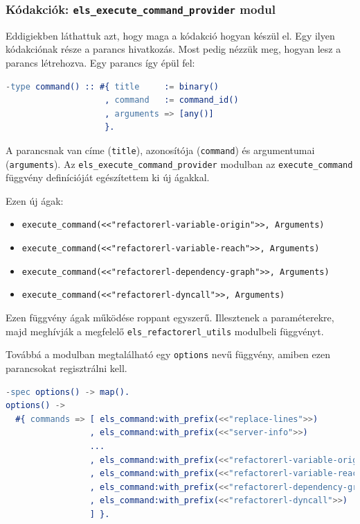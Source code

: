 \subsubsection{Kódakciók: \lstinline{els_execute_command_provider} modul }

Eddigiekben láthattuk azt, hogy maga a kódakció hogyan készül el. Egy ilyen kódakciónak része a parancs hivatkozás. Most pedig nézzük meg, hogyan lesz a parancs létrehozva. Egy parancs így épül fel:

\lstset{caption=Egy példa a parancsra, label=src:erlang}
\begin{lstlisting}[language={erlang}]
-type command() :: #{ title     := binary()
                    , command   := command_id()
                    , arguments => [any()]
                    }.
\end{lstlisting}

A parancsnak van címe (\lstinline{title}), azonosítója (\lstinline{command}) és argumentumai (\lstinline{arguments}). Az \lstinline{els_execute_command_provider} modulban az \lstinline{execute_command} függvény definícióját egészítettem ki új ágakkal.

Ezen új ágak:
\begin{itemize}
    \item \lstinline{execute_command(<<"refactorerl-variable-origin">>, Arguments)}
    \item \lstinline{execute_command(<<"refactorerl-variable-reach">>, Arguments)}
    \item \lstinline{execute_command(<<"refactorerl-dependency-graph">>, Arguments)}
    \item \lstinline{execute_command(<<"refactorerl-dyncall">>, Arguments)}
\end{itemize}

Ezen függvény ágak működése roppant egyszerű. Illesztenek a paraméterekre, majd meghívják a megfelelő \lstinline{els_refactorerl_utils} modulbeli függvényt.

Továbbá a modulban megtalálható egy \lstinline{options} nevű függvény, amiben ezen parancsokat regisztrálni kell.

\begin{lstlisting}[language={erlang}]
-spec options() -> map().
options() ->
  #{ commands => [ els_command:with_prefix(<<"replace-lines">>)
                 , els_command:with_prefix(<<"server-info">>)
                 ...
                 , els_command:with_prefix(<<"refactorerl-variable-origin">>)
                 , els_command:with_prefix(<<"refactorerl-variable-reach">>)
                 , els_command:with_prefix(<<"refactorerl-dependency-graph">>)
                 , els_command:with_prefix(<<"refactorerl-dyncall">>)
                 ] }.
\end{lstlisting}

